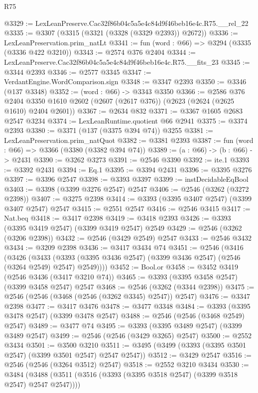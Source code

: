 \begin{lexlean}{R75}
\begin{coremodule}
@3329 := LexLeanPreserve.Cac32f86b04c5a5e4c84d9f46beb16e4c.R75.__rel_22
@3335 := @3307 (@3315 (@3321 (@3328 (@3329 @2393)) @2672))
@3336 := LexLeanPreservation.prim_natLt
@3341 := fun (word : @66) => @3294 (@3335 (@3336 @422 @3210))
@3343 := @2574 @376 @2404
@3344 := LexLeanPreserve.Cac32f86b04c5a5e4c84d9f46beb16e4c.R75.__fits_23
@3345 := @3344 @2393
@3346 := @2577 @3345
@3347 := VerdantEngine.WordComparison.sign
@3348 := @3347 @2393
@3350 := @3346 (@137 @3348)
@3352 := (word : @66) -> @3343 @3350
@3366 := @2586
    @376
    @2404
    @3350
    @1610
    @2602
    (@2607 (@2617 @376))
    (@2623 (@2624 (@2625 @1610) @2404 @2601))
@3367 := @2634 @832
@3371 := @3367 @1605 @2683 @2547 @3234
@3374 := LexLeanRuntime.quotient @66 @2941
@3375 := @3374 @2393
@3380 := @3371 (@137 (@3375 @394 @74)) @3255
@3381 := LexLeanPreservation.prim_natQuot
@3382 := @3381 @2393
@3387 := fun (word : @66) => @3366 (@3380 (@3382 @394 @74))
@3389 := (a : @66) -> (b : @66) -> @2431
@3390 := @3262 @3273
@3391 := @2546 @3390
@3392 := ite.{1}
@3393 := @3392 @2431
@3394 := Eq.{1}
@3395 := @3394 @2431
@3396 := @3395 @3276
@3397 := @3396 @2547
@3398 := @3393 @3397
@3399 := instDecidableEqBool
@3403 := @3398 (@3399 @3276 @2547) @2547
@3406 := @2546 (@3262 (@3272 @2398))
@3407 := @3275 @2398
@3414 := @3393 (@3395 @3407 @2547) (@3399 @3407 @2547) @2547
@3415 := @2551 @2547
@3416 := @2546 @3415
@3417 := Nat.beq
@3418 := @3417 @2398
@3419 := @3418 @2393
@3426 := @3393 (@3395 @3419 @2547) (@3399 @3419 @2547) @2549
@3429 := @2546 (@3262 (@3206 @2398))
@3432 := @2546 (@3429 @2549) @2547
@3433 := @2546 @3432
@3434 := @3209 @2398
@3436 := @3417 @3434 @74
@3451 := @2546
    (@3416
      (@3426
        (@3433 (@3393 (@3395 @3436 @2547) (@3399 @3436 @2547) (@2546 (@3264 @2549) @2547) @2549))))
@3452 := Bool.or
@3458 := @3452 @3419 (@2546 @3436 (@3417 @3210 @74))
@3465 := @3393 (@3395 @3458 @2547) (@3399 @3458 @2547) @2547
@3468 := @2546 (@3262 (@3344 @2398))
@3475 := @2546 (@2546 (@3468 (@2546 (@3262 @3345) @2547)) @2547)
@3476 := @3347 @2398
@3477 := @3417 @3476
@3478 := @3477 @3348
@3484 := @3393 (@3395 @3478 @2547) (@3399 @3478 @2547)
@3488 := @2546 (@2546 (@3468 @2549) @2547)
@3489 := @3477 @74
@3495 := @3393 (@3395 @3489 @2547) (@3399 @3489 @2547)
@3499 := @2546 (@2546 (@3429 @3265) @2547)
@3500 := @2552 @3434
@3501 := @3500 @3210
@3511 := @3495 (@3499 (@3393 (@3395 @3501 @2547) (@3399 @3501 @2547) @2547 @2547))
@3512 := @3429 @2547
@3516 := @2546 (@2546 (@3264 @3512) @2547)
@3518 := @2552 @3210 @3434
@3530 := @3484 (@3488 (@3511 (@3516 (@3393 (@3395 @3518 @2547) (@3399 @3518 @2547) @2547 @2547))))

\end{coremodule}
\end{lexlean}
